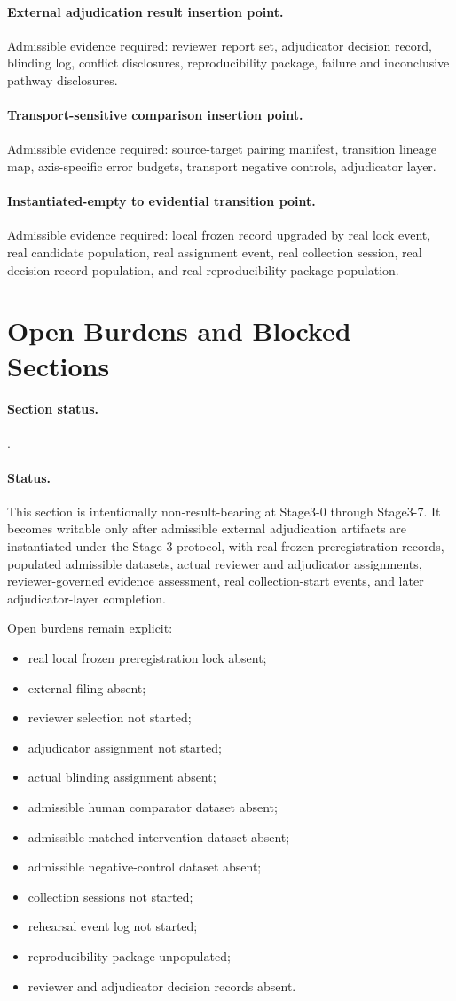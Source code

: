 \documentclass[11pt]{article}
\newcommand{\sectionstatus}[1]{\paragraph{Section status.}\texttt{\detokenize{#1}}.}
\newcommand{\blockedresultstatus}{\paragraph{Status.} This section is intentionally non-result-bearing at Stage3-0 through Stage3-7. It becomes writable only after admissible external adjudication artifacts are instantiated under the Stage 3 protocol, with real frozen preregistration records, populated admissible datasets, actual reviewer and adjudicator assignments, reviewer-governed evidence assessment, real collection-start events, and later adjudicator-layer completion.}
\begin{document}
\paragraph{External adjudication result insertion point.}
Admissible evidence required: reviewer report set, adjudicator decision record,
blinding log, conflict disclosures, reproducibility package, failure and
inconclusive pathway disclosures.

\paragraph{Transport-sensitive comparison insertion point.}
Admissible evidence required: source-target pairing manifest, transition
lineage map, axis-specific error budgets, transport negative controls,
adjudicator layer.

\paragraph{Instantiated-empty to evidential transition point.}
Admissible evidence required: local frozen record upgraded by real lock event,
real candidate population, real assignment event, real collection session,
real decision record population, and real reproducibility package population.

\section{Open Burdens and Blocked Sections}
\sectionstatus{blocked_until_execution}

\blockedresultstatus

Open burdens remain explicit:

\begin{itemize}
\item real local frozen preregistration lock absent;
\item external filing absent;
\item reviewer selection not started;
\item adjudicator assignment not started;
\item actual blinding assignment absent;
\item admissible human comparator dataset absent;
\item admissible matched-intervention dataset absent;
\item admissible negative-control dataset absent;
\item collection sessions not started;
\item rehearsal event log not started;
\item reproducibility package unpopulated;
\item reviewer and adjudicator decision records absent.
\end{itemize}
\end{document}
